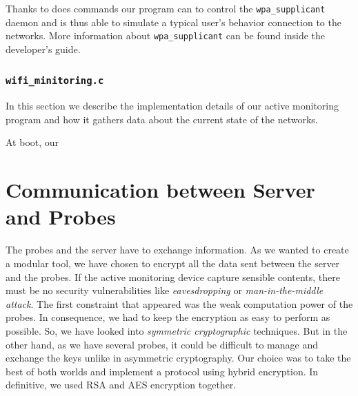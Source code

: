 Thanks to does commands our program can to control the \texttt{wpa\_supplicant} daemon and is thus able to simulate a typical user's behavior connection to the networks. More information about \texttt{wpa\_supplicant} can be found inside the developer's guide\cite{wpa-supplicant-devel}.


\subsubsection{\texttt{wifi\_minitoring.c}}
In this section we describe the implementation details of our active monitoring program and how it gathers data about the current state of the networks.

At boot, our 





\section{Communication between Server and Probes}
The probes and the server have to exchange information. As we wanted to create a modular tool, we have chosen to encrypt all the data sent between the server and the probes. If the active monitoring device capture sensible contents, there must be no security vulnerabilities like \emph{eavesdropping} or \emph{man-in-the-middle attack}.
The first constraint that appeared was the weak computation power of the probes. In consequence, we had to keep the encryption as easy to perform as possible. So, we have looked into \emph{symmetric cryptographic} techniques. But in the other hand, as we have several probes, it could be difficult to manage and exchange the keys unlike in asymmetric cryptography. Our choice was to take the best of both worlds and implement a protocol using hybrid encryption.
In definitive, we used RSA and AES encryption together.
